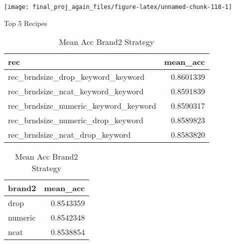 \documentclass[
]{article}
\begin{document}
\begin{center}\texttt{[image: final\_proj\_again\_files/figure-latex/unnamed-chunk-118-1]} \end{center}

\captionsetup[table]{labelformat=empty}

\begin{table}[!htb]
\centering
\begin{minipage}{0.48\linewidth}
\caption{\label{tab:1}Top 5 Recipes}

\centering\begingroup\fontsize{8}{10}\selectfont

\begin{tabular}{lr}
\toprule
rec & mean\_acc\\
\midrule
\rowcolor{gray!6}  rec\_brndsize\_drop\_keyword\_keyword & 0.8601339\\
rec\_brndsize\_ncat\_keyword\_keyword & 0.8591839\\
\rowcolor{gray!6}  rec\_brndsize\_numeric\_keyword\_keyword & 0.8590317\\
rec\_brndsize\_numeric\_drop\_keyword & 0.8589823\\
\rowcolor{gray!6}  rec\_brndsize\_ncat\_drop\_keyword & 0.8583820\\
\bottomrule
\end{tabular}
\endgroup{}
\end{minipage}
\begin{minipage}{0.48\linewidth}
\caption{\label{tab:2}Mean Acc Brand2 Strategy}
\centering\begingroup\fontsize{8}{10}\selectfont

\begin{tabular}{lr}
\toprule
brand2 & mean\_acc\\
\midrule
\rowcolor{gray!6}  drop & 0.8543359\\
numeric & 0.8542348\\
\rowcolor{gray!6}  ncat & 0.8538854\\
\bottomrule
\end{tabular}
\endgroup{}
\end{minipage}
\end{table}

\captionsetup[table]{labelformat=empty}
\end{document}

